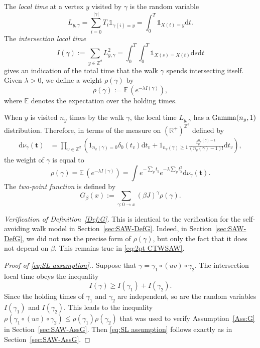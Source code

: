 \documentclass[11pt,a4paper]{article}
\numberwithin{equation}{section}
\theoremstyle{plain}
\theoremstyle{definition}
\newcommand\1{\mathds{1}}
\newcommand{\D}{\mathrm{d}}
\begin{document}
The \emph{local time} at a vertex $y$ visited by $\gamma$ is the random
variable
\begin{equation}
    L_{y,\gamma} = \sum_{i=0}^{|\gamma|} T_i \1_{\gamma(i)=y}
    =
    \int_0^T \1_{X(t)=y} \D t.
\end{equation}
The \emph{intersection local time}
\begin{equation}
    I(\gamma) :=
    \sum_{y\in \mathbb Z^d} L_{y,\gamma}^2 = \int_0^T \int_0^T \1_{X(s)=X(t)} \D s \D t
\end{equation}
gives an indication of the total time that
the walk $\gamma$ spends intersecting itself.
Given $\lambda >0$, we define a weight $\rho(\gamma)$ by
\begin{equation}
    \rho(\gamma) := \mathbb E \, (e^{-\lambda I(\gamma)}),
\end{equation}
where $\mathbb E$ denotes the expectation over the holding times.

When $y$ is visited $n_y$ times by the walk $\gamma$, the local time $L_{y,\gamma}$ has a ${\rm Gamma}(n_y,1)$ distribution.
Therefore, in terms of the
measure on $(\mathbb R^+)^{\mathbb Z^d}$ defined by
\begin{align}
\label{eq:dnu-CTWSAW}
    \mathrm{d}\nu_{\gamma}(\mathbf{t}) &= \prod_{v \in \mathbb Z^d } \left(\mathrm{1}_{n_v(\gamma)=0}\delta_0(t_v)\mathrm{d}t_v+ \mathrm{1}_{n_v(\gamma)\geq 1} \frac{t_v^{n_v(\gamma)-1}}{(n_v(\gamma)-1)!}\mathrm{d}t_v\right),
\end{align}
the weight of $\gamma$ is equal to
\begin{equation}
    \rho(\gamma)
    = \mathbb E \, (e^{-\lambda I(\gamma)})
    =
    \int
    e^{-\sum_y  t_y} e^{-\lambda\sum_y  t_y^2}
    \D \nu_{\gamma}(\mathbf{t})
.
\end{equation}
The \emph{two-point function} is defined by
\begin{equation}\label{eq:2pt CTWSAW}
    G_\beta(x) := \sum_{\gamma: 0 \to x} (\beta J)^\gamma \rho (\gamma).
\end{equation}

\smallskip\noindent
\emph{Verification of Definition~\textup{\ref{Def:G}}.}
This is identical to the verification for the self-avoiding walk model in Section~\ref{sec:SAW-DefG}. Indeed, in Section~\ref{sec:SAW-DefG}, we did not use the precise form of $\rho (\gamma)$, but only the fact that it does not depend on $\beta$. This remains true in
\eqref{eq:2pt CTWSAW}.

\begin{proof}[Proof of \eqref{eq:SL assumption}.]
Suppose that $\gamma = \gamma_1 \circ (uv) \circ \gamma_2$.
The intersection local time obeys the inequality
\begin{equation}
    I(\gamma) \ge I(\gamma_1)+I(\gamma_2).
\end{equation}
Since the holding times of $\gamma_1$ and $\gamma_2$ are independent, so are the random variables $I(\gamma_1)$ and $I(\gamma_2)$.
This leads to the inequality $\rho(\gamma_1 \circ (uv) \circ \gamma_2) \leq \rho(\gamma_1)
\rho(\gamma_2)$ that was used to verify Assumption~\ref{Ass:G} in
Section~\ref{sec:SAW-AssG}.
Then \eqref{eq:SL assumption} follows exactly as in Section~\ref{sec:SAW-AssG}.
\end{proof}
\end{document}
